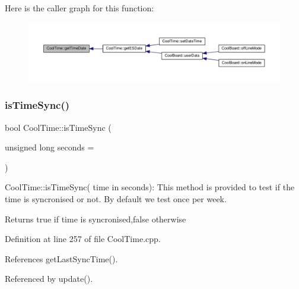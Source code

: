 Here is the caller graph for this function\+:
\nopagebreak
\begin{figure}[H]
\begin{center}
\leavevmode
\includegraphics[width=350pt]{classCoolTime_a7a7501c5ca77dd1248bea704c44f986c_icgraph}
\end{center}
\end{figure}
\mbox{\label{classCoolTime_a5ae038a4498602b189f76a10bf02adf8}} 
\subsubsection{\texorpdfstring{is\+Time\+Sync()}{isTimeSync()}}
{\footnotesize\ttfamily bool Cool\+Time\+::is\+Time\+Sync (\begin{DoxyParamCaption}\item[{unsigned long}]{seconds = {} }\end{DoxyParamCaption})}

Cool\+Time\+::is\+Time\+Sync( time in seconds)\+: This method is provided to test if the time is syncronised or not. By default we test once per week.

\begin{DoxyReturn}{Returns}
true if time is syncronised,false otherwise 
\end{DoxyReturn}


Definition at line 257 of file Cool\+Time.\+cpp.



References get\+Last\+Sync\+Time().



Referenced by update().


